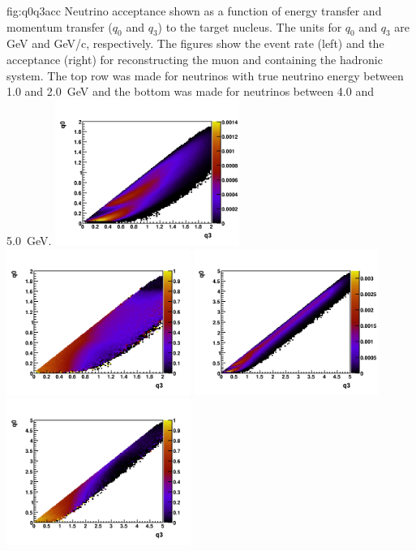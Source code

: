 \begin{dunefigure}{fig:q0q3acc}
{Neutrino acceptance shown as a function of energy transfer and momentum transfer ($q_0$ and $q_3$) to the target nucleus. The units for $q_0$ and $q_3$ are GeV and GeV/c, respectively. The figures show the event rate (left) and the acceptance (right) for reconstructing the muon and containing the hadronic system. The top row was made for neutrinos with true neutrino energy between \num{1.0} and \SI{2.0}{GeV} and the bottom was made for neutrinos between \num{4.0} and \SI{5.0}{GeV}.}
      \includegraphics[width=0.45\textwidth]{graphics/rate_q0q3_Ev_1000_2000.png}
      \includegraphics[width=0.45\textwidth]{graphics/eff_q0q3_Ev_1000_2000.png}
      \includegraphics[width=0.45\textwidth]{graphics/rate_q0q3_Ev_4000_5000.png}
      \includegraphics[width=0.45\textwidth]{graphics/eff_q0q3_Ev_4000_5000.png}
\end{dunefigure}


